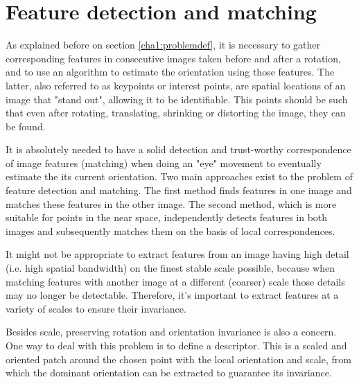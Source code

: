 
\section{Feature detection and matching}
\label{cha2:features}

As explained before on section \ref{cha1:problemdef}, it is necessary to gather corresponding features in consecutive images taken before and after a rotation, and to use an algorithm to estimate the orientation using those features. The latter, also referred to as keypoints or interest points, are spatial locations of an image that "stand out", allowing it to be identifiable. This points should be such that even after rotating, translating, shrinking or distorting the image, they can be found.

It is absolutely needed to have a solid detection and trust-worthy correspondence of image features (matching) when doing an "eye" movement to eventually estimate the its current orientation. Two main approaches exist to the problem of feature detection and matching. The first method finds features in one image and matches these features in the other image. The second method, which is more suitable for points in the near space, independently detects features in both images and subsequently matches them on the basis of local correspondences.

It might not be appropriate to extract features from an image having high detail (i.e. high spatial bandwidth) on the finest stable scale possible, because when matching features with another image at a different (coarser) scale those details may no longer be detectable. Therefore, it's important to extract features at a variety of scales to ensure their invariance. 

Besides scale, preserving rotation and orientation invariance is also a concern. One way to deal with this problem is to define a descriptor. This is a scaled and oriented patch around the chosen point with the local orientation and scale, from which the dominant orientation can be extracted to guarantee its invariance. \cite{multiview}

